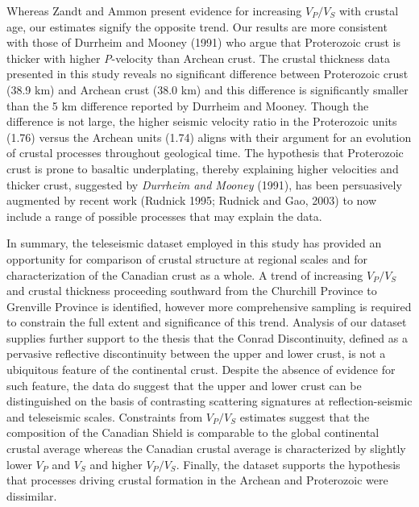 \documentclass[review]{elsarticle}
\begin{document}
Whereas Zandt and Ammon present evidence for increasing $V_P/V_S$ with crustal age, our estimates signify the opposite trend. Our results are more consistent with those of Durrheim and Mooney (1991) who argue that Proterozoic crust is thicker with higher {\it P}-velocity than Archean crust. The crustal thickness data presented in this study reveals no significant difference between Proterozoic crust (38.9 km) and Archean crust (38.0 km) and this difference is significantly smaller than the 5 km difference reported by Durrheim and Mooney. Though the difference is not large, the higher seismic velocity ratio in the Proterozoic units (1.76) versus the Archean units (1.74) aligns with their argument for an evolution of crustal processes throughout geological time. The hypothesis that Proterozoic crust is prone to basaltic underplating, thereby explaining higher velocities and thicker crust, suggested by {\it Durrheim and Mooney} (1991), has been persuasively augmented by recent work (Rudnick 1995; Rudnick and Gao, 2003) to now include a range of possible processes that may explain the data.

In summary, the teleseismic dataset employed in this study has provided an opportunity for comparison of crustal structure at regional scales and for characterization of the Canadian crust as a whole. A trend of increasing $V_P/V_S$ and crustal thickness proceeding southward from the Churchill Province to Grenville Province is identified, however more comprehensive sampling is required to constrain the full extent and significance of this trend. Analysis of our dataset supplies further support to the thesis that the Conrad Discontinuity, defined as a pervasive reflective discontinuity between the upper and lower crust, is not a ubiquitous feature of the continental crust. Despite the absence of evidence for such feature, the data do suggest that the upper and lower crust can be distinguished on the basis of contrasting scattering signatures at reflection-seismic and teleseismic scales. Constraints from $V_P/V_S$ estimates suggest that the composition of the Canadian Shield is comparable to the global continental crustal average whereas the Canadian crustal average is characterized by slightly lower $V_P$ and $V_S$ and higher $V_P/V_S$. Finally, the dataset supports the hypothesis that processes driving crustal formation in the Archean and Proterozoic were dissimilar.

\end{document}
